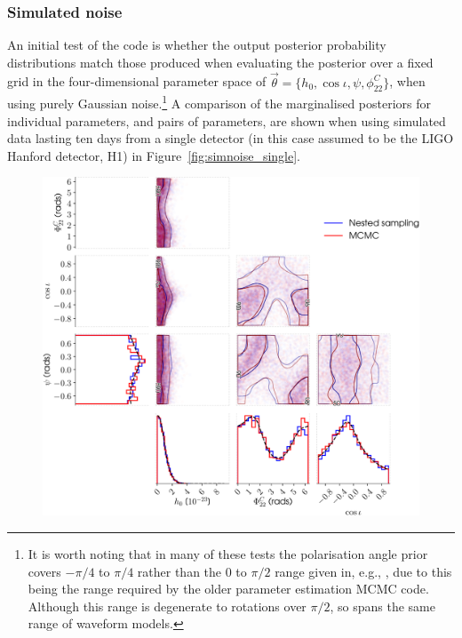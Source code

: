 \subsubsection{Simulated noise}\label{sec:simnoise}

An initial test of the code is whether the output posterior probability distributions match those produced when evaluating the
posterior over a fixed grid in the four-dimensional parameter space of $\vec{\theta} = \{h_0, \cos{\iota}, \psi, \phi_{22}^C\}$, when
using purely Gaussian noise.\footnote{It is worth noting that in many of these tests the polarisation angle prior covers $-\pi/4$ to $\pi/4$
rather than the 0 to $\pi/2$ range given in, e.g., \citet{2015MNRAS.453.4399P}, due to this being the range required by the older
parameter estimation MCMC code. Although this range is degenerate to rotations over $\pi/2$, so spans the same range of waveform models.}
A comparison of the marginalised posteriors for individual parameters, and pairs of parameters, are shown when using simulated data lasting
ten days from a single detector (in this case assumed to be the LIGO Hanford detector, H1) in Figure~\ref{fig:simnoise_single}.

\begin{figure}[!phtb]
\begin{center}
\includegraphics[width=1\columnwidth]{./figures/codeeval/simulations/noise/simulatednoisetest}
\caption{ \protect}
\end{center}
\end{figure}

